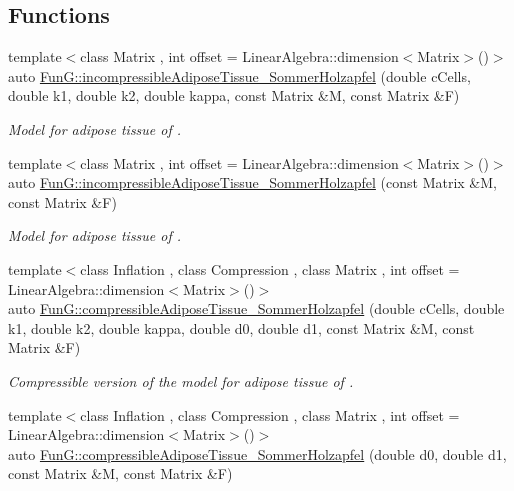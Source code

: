 \subsection*{Functions}
\begin{DoxyCompactItemize}
\item 
{\footnotesize template$<$class Matrix , int offset = Linear\-Algebra\-::dimension$<$\-Matrix$>$()$>$ }\\auto \hyperlink{group__Biomechanics_gac269eefc1abb994044e1634c20a98061}{Fun\-G\-::incompressible\-Adipose\-Tissue\-\_\-\-Sommer\-Holzapfel} (double c\-Cells, double k1, double k2, double kappa, const Matrix \&M, const Matrix \&F)
\begin{DoxyCompactList}\small\item\em Model for adipose tissue of \cite{Sommer2013}. \end{DoxyCompactList}\item 
{\footnotesize template$<$class Matrix , int offset = Linear\-Algebra\-::dimension$<$\-Matrix$>$()$>$ }\\auto \hyperlink{group__Biomechanics_ga01ab128bcf179f4431b0270179af9e20}{Fun\-G\-::incompressible\-Adipose\-Tissue\-\_\-\-Sommer\-Holzapfel} (const Matrix \&M, const Matrix \&F)
\begin{DoxyCompactList}\small\item\em Model for adipose tissue of \cite{Sommer2013}. \end{DoxyCompactList}\item 
{\footnotesize template$<$class Inflation , class Compression , class Matrix , int offset = Linear\-Algebra\-::dimension$<$\-Matrix$>$()$>$ }\\auto \hyperlink{group__Biomechanics_ga5c3388564c0420b62e58f48c739d27f1}{Fun\-G\-::compressible\-Adipose\-Tissue\-\_\-\-Sommer\-Holzapfel} (double c\-Cells, double k1, double k2, double kappa, double d0, double d1, const Matrix \&M, const Matrix \&F)
\begin{DoxyCompactList}\small\item\em Compressible version of the model for adipose tissue of \cite{Sommer2013}. \end{DoxyCompactList}\item 
{\footnotesize template$<$class Inflation , class Compression , class Matrix , int offset = Linear\-Algebra\-::dimension$<$\-Matrix$>$()$>$ }\\auto \hyperlink{group__Biomechanics_ga27bb3f7c579ce8c21a69ea4d4d0169d7}{Fun\-G\-::compressible\-Adipose\-Tissue\-\_\-\-Sommer\-Holzapfel} (double d0, double d1, const Matrix \&M, const Matrix \&F)

\end{DoxyCompactItemize}
